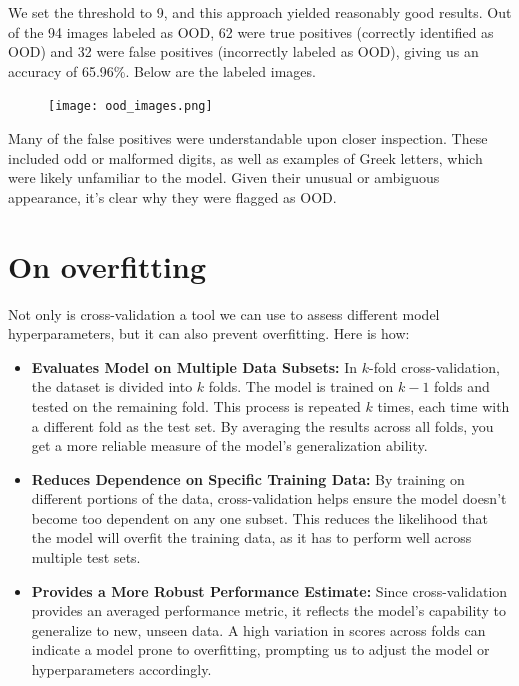 \documentclass{article}
\begin{document}
We set the threshold to 9, and this approach yielded reasonably good results. Out of the 94 images labeled as OOD, 62 were true positives (correctly identified as OOD) and 32 were false positives (incorrectly labeled as OOD), giving us an accuracy of 65.96\%. Below are the labeled images.

\begin{figure}[H]
    \centering
    \texttt{[image: ood\_images.png]}
\end{figure}
Many of the false positives were understandable upon closer inspection. These included odd or malformed digits, as well as examples of Greek letters, which were likely unfamiliar to the model. Given their unusual or ambiguous appearance, it's clear why they were flagged as OOD.
\newpage

\section{On overfitting}

Not only is cross-validation a tool we can use to assess different model hyperparameters, but it can also prevent overfitting. Here is how: 

\begin{itemize}
    \item \textbf{Evaluates Model on Multiple Data Subsets: }In $k$-fold cross-validation, the dataset is divided into $k$ folds. The model is trained on $k-1$ folds and tested on the remaining fold. This process is repeated $k$ times, each time with a different fold as the test set. By averaging the results across all folds, you get a more reliable measure of the model’s generalization ability.

    \item \textbf{Reduces Dependence on Specific Training Data:} By training on different portions of the data, cross-validation helps ensure the model doesn't become too dependent on any one subset. This reduces the likelihood that the model will overfit the training data, as it has to perform well across multiple test sets.

    \item \textbf{Provides a More Robust Performance Estimate:} Since cross-validation provides an averaged performance metric, it reflects the model's capability to generalize to new, unseen data. A high variation in scores across folds can indicate a model prone to overfitting, prompting us to adjust the model or hyperparameters accordingly.

\end{itemize}
\end{document}
